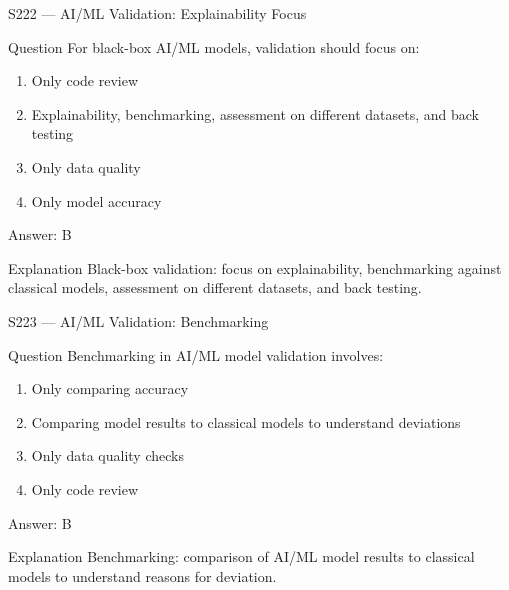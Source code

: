 \documentclass[aspectratio=169,8pt]{beamer}
\begin{document}
	\begin{frame}{S222 --- AI/ML Validation: Explainability Focus}
		\begin{block}{Question}
			For black-box AI/ML models, validation should focus on:
			\begin{enumerate}
				\item Only code review
				\item Explainability, benchmarking, assessment on different datasets, and back testing
				\item Only data quality
				\item Only model accuracy
			\end{enumerate}
		\end{block}
		\begin{exampleblock}{Answer: B}\end{exampleblock}
		\begin{block}{Explanation}
			Black-box validation: focus on explainability, benchmarking against classical models, assessment on different datasets, and back testing.
		\end{block}
	\end{frame}
	
	\begin{frame}{S223 --- AI/ML Validation: Benchmarking}
		\begin{block}{Question}
			Benchmarking in AI/ML model validation involves:
			\begin{enumerate}
				\item Only comparing accuracy
				\item Comparing model results to classical models to understand deviations
				\item Only data quality checks
				\item Only code review
			\end{enumerate}
		\end{block}
		\begin{exampleblock}{Answer: B}\end{exampleblock}
		\begin{block}{Explanation}
			Benchmarking: comparison of AI/ML model results to classical models to understand reasons for deviation.
		\end{block}
	\end{frame}
	
\end{document}
